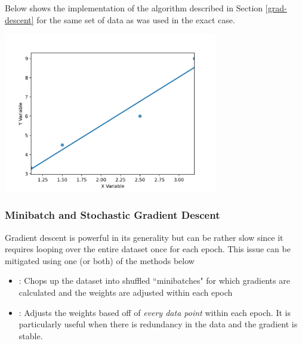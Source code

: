 Below shows the implementation of the algorithm described in Section \ref{grad-descent} for the same set of data as was used in the exact case.



\centerline{\includegraphics[width=0.7\textwidth]{mathematics/fig/linearRegressionGradient.png}}



\subsubsection{Minibatch and Stochastic Gradient Descent}

Gradient descent is powerful in its generality but can be rather slow since it requires looping over the entire dataset once for each epoch. This issue can be mitigated using one (or both) of the methods below
\begin{itemize}
    \item {}: Chops up the dataset into shuffled ``minibatches" for which gradients are calculated and the weights are adjusted within each epoch
    \item {}: Adjusts the weights based off of \emph{every data point} within each epoch. It is particularly useful when there is redundancy in the data and the gradient is stable.
\end{itemize}


